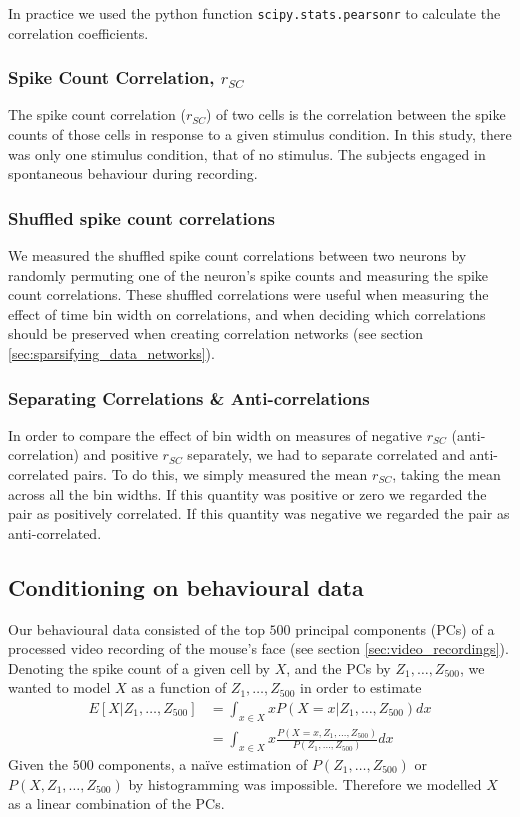 \documentclass[a4paper,12pt]{article}
\theoremstyle{definition}
\begin{document}
    In practice we used the python function \texttt{scipy.stats.pearsonr} to calculate the correlation coefficients.

        \subsubsection{Spike Count Correlation, $r_{SC}$}\label{sec:spike_count_correlation}
        The spike count correlation ($r_{SC}$) of two cells is the correlation between the spike counts of those cells in response to a given stimulus condition. In this study, there was only one stimulus condition, that of no stimulus. The subjects engaged in spontaneous behaviour during recording.

        \subsubsection{Shuffled spike count correlations}\label{sec:shuffled_correlations}
        We measured the shuffled spike count correlations between two neurons by randomly permuting one of the neuron's spike counts and measuring the spike count correlations. These shuffled correlations were useful when measuring the effect of time bin width on correlations, and when deciding which correlations should be preserved when creating correlation networks (see section \ref{sec:sparsifying_data_networks}).

        \subsubsection{Separating Correlations \& Anti-correlations}\label{sec:corr_anti_corr}
        In order to compare the effect of bin width on measures of negative $r_{SC}$ (anti-correlation) and positive $r_{SC}$ separately, we had to separate correlated and anti-correlated pairs. To do this, we simply measured the mean $r_{SC}$, taking the mean across all the bin widths. If this quantity was positive or zero we regarded the pair as positively correlated. If this quantity was negative we regarded the pair as anti-correlated.

    \subsection{Conditioning on behavioural data}
    Our behavioural data consisted of the top $500$ principal components (PCs) of a processed video recording of the mouse's face (see section \ref{sec:video_recordings}). Denoting the spike count of a given cell by $X$, and the PCs by $Z_1,\dots,Z_{500}$, we wanted to model $X$ as a function of $Z_1,\dots,Z_{500}$ in order to estimate
    \begin{align}
      E[X|Z_1,\dots,Z_{500}] &= \int_{x \in X} x P(X=x | Z_1,\dots,Z_{500}) dx \\
        &= \int_{x \in X} x \frac{P(X=x, Z_1,\dots,Z_{500})}{P(Z_1,\dots,Z_{500})} dx
    \end{align}
    Given the $500$ components, a na\"{i}ve estimation of $P(Z_1,\dots,Z_{500})$ or $P(X, Z_1,\dots,Z_{500})$ by histogramming was impossible. Therefore we modelled $X$ as a linear combination of the PCs.
\end{document}
